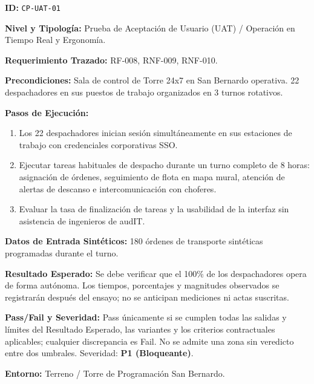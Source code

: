 \par\noindent\textbf{ID:} \texttt{C\allowbreak{}P\allowbreak{}-\allowbreak{}U\allowbreak{}A\allowbreak{}T\allowbreak{}-\allowbreak{}0\allowbreak{}1\allowbreak{}}\par
\par\noindent\textbf{Nivel y Tipología:} Prueba de Aceptación de Usuario (UAT) / Operación en Tiempo Real y Ergonomía.\par
\par\noindent\textbf{Requerimiento Trazado:} RF-008, RNF-009, RNF-010.\par
\par\noindent\textbf{Precondiciones:} Sala de control de Torre 24x7 en San Bernardo operativa. 22 despachadores en sus puestos de trabajo organizados en 3 turnos rotativos.\par
\par\noindent\textbf{Pasos de Ejecución:} \par
\begin{enumerate}
\item Los 22 despachadores inician sesión simultáneamente en sus estaciones de trabajo con credenciales corporativas SSO.
\item Ejecutar tareas habituales de despacho durante un turno completo de 8 horas: asignación de órdenes, seguimiento de flota en mapa mural, atención de alertas de descanso e intercomunicación con choferes.
\item Evaluar la tasa de finalización de tareas y la usabilidad de la interfaz sin asistencia de ingenieros de audIT.
\end{enumerate}
\par\noindent\textbf{Datos de Entrada Sintéticos:} 180 órdenes de transporte sintéticas programadas durante el turno.\par
\par\noindent\textbf{Resultado Esperado:} Se debe verificar que el 100\% de los despachadores opera de forma autónoma. Los tiempos, porcentajes y magnitudes observados se registrarán después del ensayo; no se anticipan mediciones ni actas suscritas.\par
\par\noindent\textbf{Pass/Fail y Severidad:} Pass únicamente si se cumplen todas las salidas y límites del Resultado Esperado, las variantes y los criterios contractuales aplicables; cualquier discrepancia es Fail. No se admite una zona sin veredicto entre dos umbrales. Severidad: \textbf{P1 (Bloqueante)}.\par
\par\noindent\textbf{Entorno:} Terreno / Torre de Programación San Bernardo.\par




